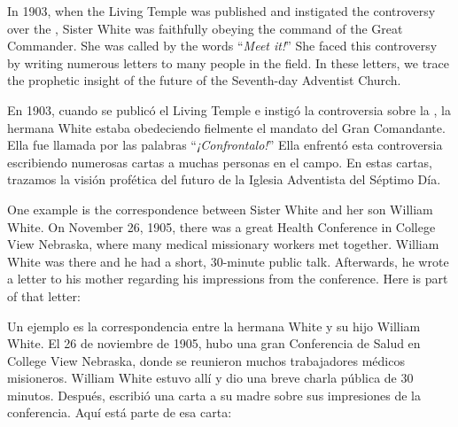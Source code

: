  \label{chap:apostasy}


 \label{chap:apostasy}


In 1903, when the Living Temple was published and instigated the controversy over the , Sister White was faithfully obeying the command of the Great Commander. She was called by the words “\textit{Meet it!}” She faced this controversy by writing numerous letters to many people in the field. In these letters, we trace the prophetic insight of the future of the Seventh-day Adventist Church.


En 1903, cuando se publicó el Living Temple e instigó la controversia sobre la , la hermana White estaba obedeciendo fielmente el mandato del Gran Comandante. Ella fue llamada por las palabras “\textit{¡Confrontalo!}” Ella enfrentó esta controversia escribiendo numerosas cartas a muchas personas en el campo. En estas cartas, trazamos la visión profética del futuro de la Iglesia Adventista del Séptimo Día.


One example is the correspondence between Sister White and her son William White. On November 26, 1905, there was a great Health Conference in College View Nebraska, where many medical missionary workers met together. William White was there and he had a short, 30-minute public talk. Afterwards, he wrote a letter to his mother regarding his impressions from the conference. Here is part of that letter:


Un ejemplo es la correspondencia entre la hermana White y su hijo William White. El 26 de noviembre de 1905, hubo una gran Conferencia de Salud en College View Nebraska, donde se reunieron muchos trabajadores médicos misioneros. William White estuvo allí y dio una breve charla pública de 30 minutos. Después, escribió una carta a su madre sobre sus impresiones de la conferencia. Aquí está parte de esa carta:


 \\
 \\


 \\
 \\


